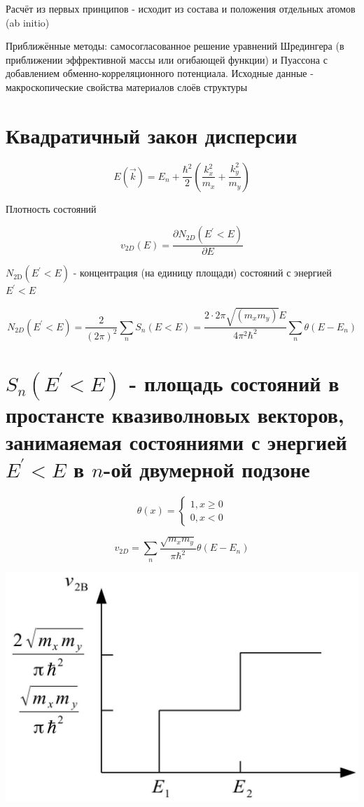 \documentclass[10pt]{article}
\begin{document}
Расчёт из первых принципов - исходит из состава и положения отдельных атомов (ab initio)

Приближённые методы: самосогласованное решение уравнений Шредингера (в приближении эффрективной массы или огибающей функции) и Пуассона с добавлением обменно-корреляционного потенциала. Исходные данные - макроскопические свойства материалов слоёв структуры

\section{Квадратичный закон дисперсии}
$$
E(\vec{k})=E_{n}+\frac{\hbar^{2}}{2}\left(\frac{k_{x}^{2}}{m_{x}}+\frac{k_{y}^{2}}{m_{y}}\right)
$$

Плотность состояний

$$
v_{2 D}(E)=\frac{\partial N_{2 D}\left(E^{\prime}<E\right)}{\partial E}
$$

$N_{2 \mathrm{D}}\left(E^{\prime}<E\right)$ - концентрация (на единицу площади) состояний с энергией $E^{\prime}<E$

$$
N_{2 D}\left(E^{\prime}<E\right)=\frac{2}{(2 \pi)^{2}} \sum_{n} S_{n}(E<E)=\frac{2 \cdot 2 \pi \sqrt{\left(m_{x} m_{y}\right)} E}{4 \pi^{2} \hbar^{2}} \sum_{n} \theta\left(E-E_{n}\right)
$$

\section{$S_{n}\left(E^{\prime}<E\right)$ - площадь состояний в простансте квазиволновых векторов, занимаяемая состояниями с энергией $E^{\prime}<E$ в $n$-ой двумерной подзоне}
$$
\theta(x)=\left\{\begin{array}{l}
1, x \geq 0 \\
0, x<0
\end{array}\right.
$$

$$
v_{2 D}=\sum_{n} \frac{\sqrt{m_{x} m_{y}}}{\pi \hbar^{2}} \theta\left(E-E_{n}\right)
$$

\begin{center}
\includegraphics[max width=\textwidth]{2023_05_21_66a3dfca5be088b7d6b7g-12}
\end{center}
\end{document}
